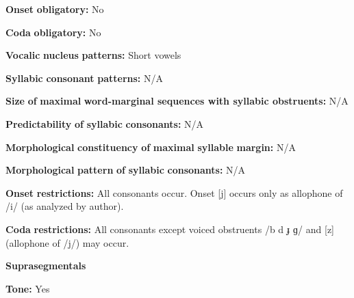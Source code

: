 \begin{styleBody}
\textbf{Onset} \textbf{obligatory:} No
\end{styleBody}

\begin{styleBody}
\textbf{Coda} \textbf{obligatory:} No
\end{styleBody}

\begin{styleBody}
\textbf{Vocalic} \textbf{nucleus} \textbf{patterns:} Short vowels
\end{styleBody}

\begin{styleBody}
\textbf{Syllabic} \textbf{consonant} \textbf{patterns:} N/A
\end{styleBody}

\begin{styleBody}
\textbf{Size} \textbf{of} \textbf{maximal} \textbf{word{}-marginal sequences with syllabic obstruents:} N/A
\end{styleBody}

\begin{styleBody}
\textbf{Predictability} \textbf{of} \textbf{syllabic} \textbf{consonants:} N/A
\end{styleBody}

\begin{styleBody}
\textbf{Morphological} \textbf{constituency} \textbf{of} \textbf{maximal} \textbf{syllable} \textbf{margin:} N/A
\end{styleBody}

\begin{styleBody}
\textbf{Morphological} \textbf{pattern} \textbf{of} \textbf{syllabic} \textbf{consonants:} N/A
\end{styleBody}

\begin{styleBody}
\textbf{Onset} \textbf{restrictions:} All consonants occur. Onset [j] occurs only as allophone of /i/ (as analyzed by author).
\end{styleBody}

\begin{styleBody}
\textbf{Coda} \textbf{restrictions:} All consonants except voiced obstruents /b d ɟ ɡ/ and [z] (allophone of /j/) may occur.
\end{styleBody}

\begin{styleBody}
\textbf{Suprasegmentals}
\end{styleBody}

\begin{styleBody}
\textbf{Tone:} Yes
\end{styleBody}

